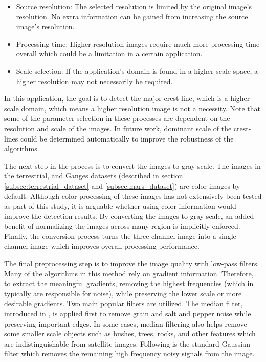 \documentclass[review]{elsarticle}
\begin{document}
\begin{itemize}
	\item Source resolution: The selected resolution is limited by the original image's resolution. No extra information can be gained from increasing the source image's resolution.
	\item Processing time: Higher resolution images require much more processing time overall which could be a limitation in a certain application.
	\item Scale selection: If the application's domain is found in a higher scale space, a higher resolution may not necessarily be required.
\end{itemize}

In this application, the goal is to detect the major crest-line, which is a higher scale domain, which means a higher resolution image is not a necessity. Note that some of the parameter selection in these processes are dependent on the resolution and scale of the images. In future work, dominant scale of the crest-lines could be determined automatically to improve the robustness of the algorithms.

The next step in the process is to convert the images to gray scale. The images in the terrestrial, and Ganges datasets (described in section \ref{subsec:terrestrial_dataset} and \ref{subsec:mars_dataset}) are color images by default. Although color processing of these images has not extensively been tested as part of this study, it is arguable whether using color information would improve the detection results. By converting the images to gray scale, an added benefit of normalizing the images across many region is implicitly enforced. Finally, the conversion process turns the three channel image into a single channel image which improves overall processing performance.

The final preprocessing step is to improve the image quality with low-pass filters. Many of the algorithms in this method rely on gradient information. Therefore, to extract the meaningful gradients, removing the highest frequencies (which in typically are responsible for noise), while preserving the lower scale or more desirable gradients. Two main popular filters are utilized. The median filter, introduced in \cite{huang_median_filtering_algorithm}, is applied first to remove grain and salt and pepper noise while preserving important edges. In some cases, median filtering also helps remove some smaller scale objects such as bushes, trees, rocks, and other features which are indistinguishable from satellite images. Following is the standard Gaussian filter which removes the remaining high frequency noisy signals from the image.
\end{document}
